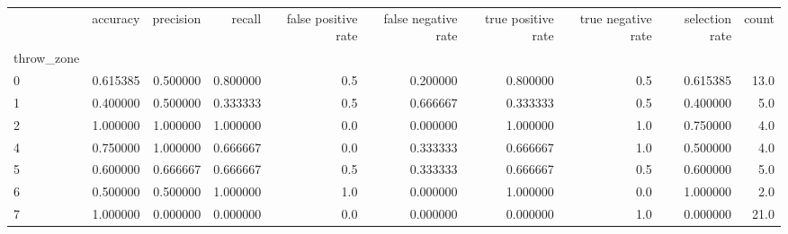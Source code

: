\begin{tabular}{lrrrrrrrrr}
\toprule
{} &  accuracy &  precision &    recall &  false positive rate &  false negative rate &  true positive rate &  true negative rate &  selection rate &  count \\
throw\_zone &           &            &           &                      &                      &                     &                     &                 &        \\
\midrule
0          &  0.615385 &   0.500000 &  0.800000 &                  0.5 &             0.200000 &            0.800000 &                 0.5 &        0.615385 &   13.0 \\
1          &  0.400000 &   0.500000 &  0.333333 &                  0.5 &             0.666667 &            0.333333 &                 0.5 &        0.400000 &    5.0 \\
2          &  1.000000 &   1.000000 &  1.000000 &                  0.0 &             0.000000 &            1.000000 &                 1.0 &        0.750000 &    4.0 \\
4          &  0.750000 &   1.000000 &  0.666667 &                  0.0 &             0.333333 &            0.666667 &                 1.0 &        0.500000 &    4.0 \\
5          &  0.600000 &   0.666667 &  0.666667 &                  0.5 &             0.333333 &            0.666667 &                 0.5 &        0.600000 &    5.0 \\
6          &  0.500000 &   0.500000 &  1.000000 &                  1.0 &             0.000000 &            1.000000 &                 0.0 &        1.000000 &    2.0 \\
7          &  1.000000 &   0.000000 &  0.000000 &                  0.0 &             0.000000 &            0.000000 &                 1.0 &        0.000000 &   21.0 \\
\bottomrule
\end{tabular}
